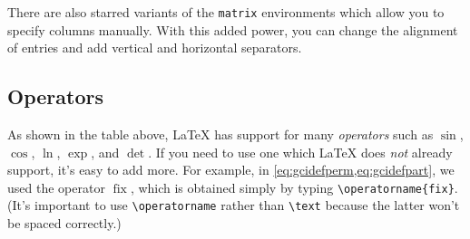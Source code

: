 \documentclass{article}
\newcommand*{\code}[1]{\texttt{#1}}
\begin{document}
There are also starred variants of the \code{matrix} environments which allow you to specify columns manually.
With this added power, you can change the alignment of entries and add vertical and horizontal separators.

\subsection{Operators}
As shown in the table above, \LaTeX{} has support for many \emph{operators} such as $\sin$, $\cos$, $\ln$, $\exp$, and $\det$.
If you need to use one which \LaTeX{} does \emph{not} already support, it's easy to add more.
For example, in \cref{eq:gcidefperm,eq:gcidefpart}, we used the operator $\operatorname{fix}$, which is obtained simply by typing \code{\textbackslash{}operatorname\{fix\}}.
(It's important to use \code{\textbackslash{}operatorname} rather than \code{\textbackslash{}text} because the latter won't be spaced correctly.)
\end{document}
